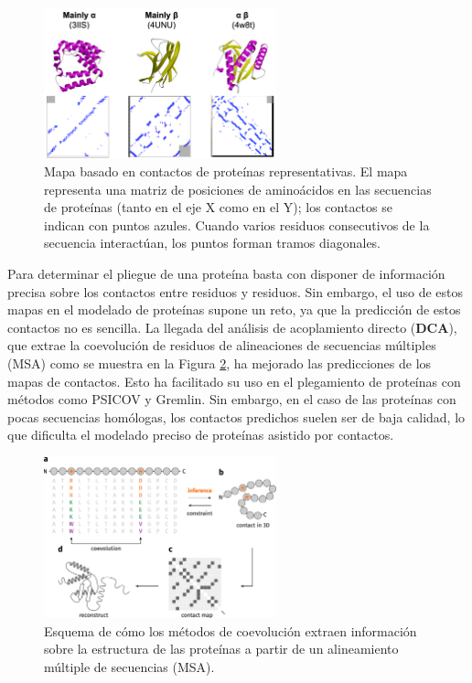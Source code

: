 \begin{figure}[h]
\centering
\includegraphics[width = 0.6\textwidth]{figs/contact.png}
\caption{Mapa basado en contactos de proteínas representativas. El mapa representa una matriz de posiciones de aminoácidos en las secuencias de proteínas (tanto en el eje X como en el Y); los contactos se indican con puntos azules. Cuando varios residuos consecutivos de la secuencia interactúan, los puntos forman tramos diagonales.}
\label{fig:contact}
\end{figure}

Para determinar el pliegue de una proteína basta con disponer de información precisa sobre los contactos entre residuos y residuos. Sin embargo, el uso de estos mapas en el modelado de proteínas supone un reto, ya que la predicción de estos contactos no es sencilla. La llegada del análisis de acoplamiento directo (\textbf{DCA}), que extrae la coevolución de residuos de alineaciones de secuencias múltiples (MSA) como se muestra en la Figura \ref{fig:contact-evol}, ha mejorado las predicciones de los mapas de contactos. Esto ha facilitado su uso en el plegamiento de proteínas con métodos como PSICOV y Gremlin. Sin embargo, en el caso de las proteínas con pocas secuencias homólogas, los contactos predichos suelen ser de baja calidad, lo que dificulta el modelado preciso de proteínas asistido por contactos.

\begin{figure}[h]
\centering
\includegraphics[width = 0.6\textwidth]{figs/contact_evol.png}
\caption{Esquema de cómo los métodos de coevolución extraen información sobre la estructura de las proteínas a partir de un alineamiento múltiple de secuencias (MSA).}
\label{fig:contact-evol}
\end{figure}

